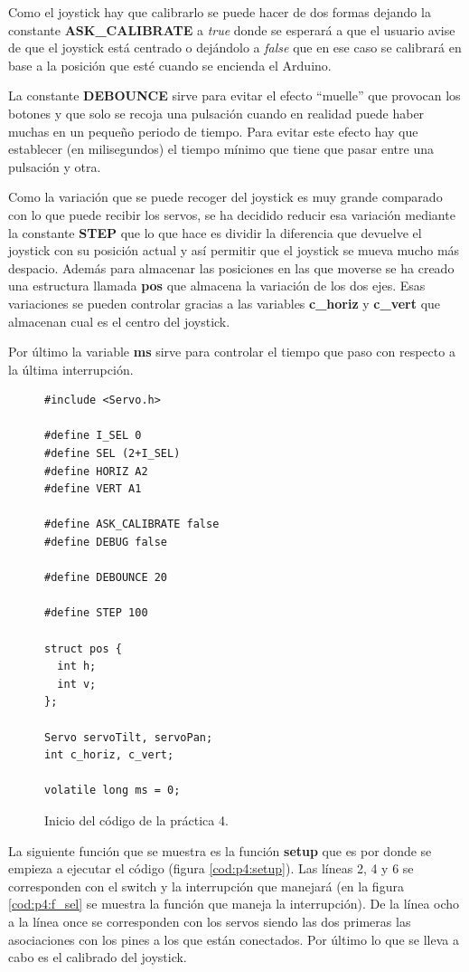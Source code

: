 \documentclass{article}
\begin{document}
	Como el joystick hay que calibrarlo se puede hacer de dos formas dejando la constante \textbf{ASK\_CALIBRATE} a \textit{true} donde se esperará a que el usuario avise de que el joystick está centrado o dejándolo a \textit{false} que en ese caso se calibrará en base a la posición que esté cuando se encienda el Arduino.

	La constante \textbf{DEBOUNCE} sirve para evitar el efecto ``muelle'' que provocan los botones y que solo se recoja una pulsación cuando en realidad puede haber muchas en un pequeño periodo de tiempo. Para evitar este efecto hay que establecer (en milisegundos) el tiempo mínimo que tiene que pasar entre una pulsación y otra.
	
	Como la variación que se puede recoger del joystick es muy grande comparado con lo que puede recibir los servos, se ha decidido reducir esa variación mediante la constante \textbf{STEP} que lo que hace es dividir la diferencia que devuelve el joystick con su posición actual y así permitir que el joystick se mueva mucho más despacio. Además para almacenar las posiciones en las que moverse se ha creado una estructura llamada \textbf{pos} que almacena la variación de los dos ejes. Esas variaciones se pueden controlar gracias a las variables \textbf{c\_horiz} y \textbf{c\_vert} que almacenan cual es el centro del joystick.
	
	Por último la variable \textbf{ms} sirve para controlar el tiempo que paso con respecto a la última interrupción.
		
\begin{figure}[h]
	\begin{lstlisting}[style=c]
#include <Servo.h>

#define I_SEL 0
#define SEL (2+I_SEL)
#define HORIZ A2
#define VERT A1

#define ASK_CALIBRATE false
#define DEBUG false

#define DEBOUNCE 20

#define STEP 100

struct pos {
  int h;
  int v; 
};

Servo servoTilt, servoPan;
int c_horiz, c_vert;

volatile long ms = 0;
	\end{lstlisting}
	\caption{Inicio del código de la práctica 4.}
	\label{cod:p4:init}
\end{figure}

	La siguiente función que se muestra es la función \textbf{setup} que es por donde se empieza a ejecutar el código (figura \ref{cod:p4:setup}). Las líneas 2, 4 y 6 se corresponden con el switch y la interrupción que manejará (en la figura \ref{cod:p4:f_sel} se muestra la función que maneja la interrupción). De la línea ocho a la línea once se corresponden con los servos siendo las dos primeras las asociaciones con los pines a los que están conectados. Por último lo que se lleva a cabo es el calibrado del joystick.
\end{document}
